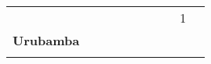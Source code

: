 \begin{tabular}{lccccccccc}
	&\cellcolor[HTML]{FCC46C}                   &\cellcolor[HTML]{FCC46C}                  
	&\cellcolor[HTML]{FCC46C}                   &\cellcolor[HTML]{FCC46C} 	  &\cellcolor[HTML]{FCC46C} 					&\cellcolor[HTML]{FCC46C} 					
	&\cellcolor[HTML]{FCC46C}					&1
	&\cellcolor[HTML]{FCC46C}\\
	\textbf{Urubamba}                                                    
	&\cellcolor[HTML]{FCC46C}                   &\cellcolor[HTML]{FCC46C}                     &\cellcolor[HTML]{FCC46C}                   &\cellcolor[HTML]{FCC46C} 		 &\cellcolor[HTML]{FCC46C}					&\cellcolor[HTML]{FCC46C}      
	&\cellcolor[HTML]{FCC46C}					&\cellcolor[HTML]{FCC46C}		
	&\cellcolor[HTML]{FCC46C}\\
	&\multicolumn{1}{l}{}                       &\multicolumn{1}{l}{}            &\multicolumn{1}{l}{}                         
	&\multicolumn{1}{l}{}                       &\multicolumn{1}{l}{}            &\multicolumn{1}{l}{}                       &\multicolumn{1}{l}{}                       &\multicolumn{1}{l}{}            &\multicolumn{1}{l}{}    
\end{tabular}
